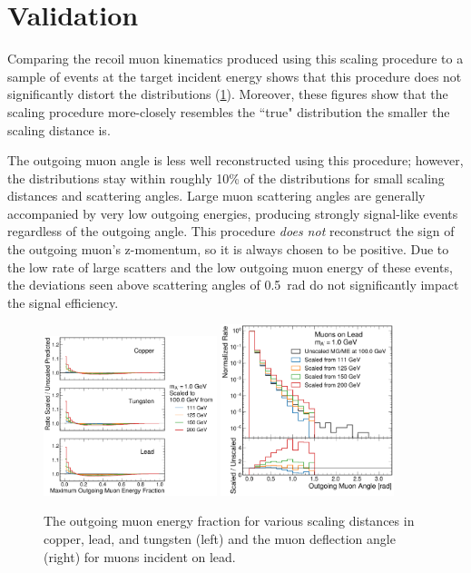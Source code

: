 \section{Validation}
\label{sec:validation}

Comparing the recoil muon kinematics produced using this scaling procedure to a sample of \mg events at the target incident energy shows that this procedure does not significantly distort the distributions (\cref{fig:dbrem_validation}).
Moreover, these figures show that the scaling procedure more-closely resembles the ``true" \mg distribution the smaller the scaling distance is.

The outgoing muon angle is less well reconstructed using this procedure; however, the distributions stay within roughly 10\% of the \mg distributions for small scaling distances and scattering angles.
Large muon scattering angles are generally accompanied by very low outgoing energies, producing strongly signal-like events regardless of the outgoing angle. 
This procedure \emph{does not} reconstruct the sign of the outgoing muon's z-momentum, so it is always chosen to be positive. 
Due to the low rate of large scatters and the low outgoing muon energy of these events, the deviations seen above scattering angles of \SI{0.5}{\radian} do not significantly impact the signal efficiency.

\begin{figure}[!htbp]
    \centering
    \includegraphics[width=0.45\textwidth]{figures/muon_efrac_cumulative_ratio.pdf}
    \hspace{0.01\textwidth}
    \includegraphics[width=0.45\textwidth]{figures/muon_lead_ang.pdf}
    \caption[
        Validation of simulated \dbrem kinematics.
    ]{
        The outgoing muon energy fraction for various scaling distances in copper, lead, and tungsten (left) and the muon deflection angle (right) for muons incident on lead.
    }
    \label{fig:dbrem_validation}
\end{figure}

